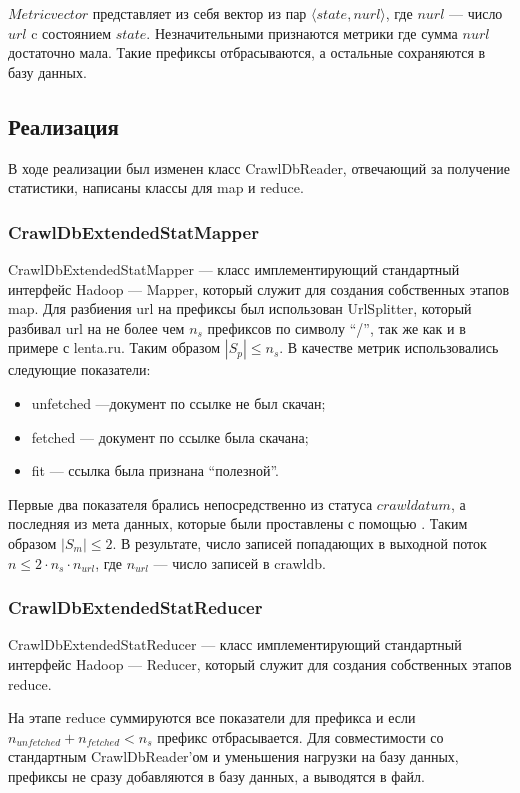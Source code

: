 $Metricvector$ представляет из себя вектор из пар $\langle state, nurl \rangle$, где $nurl$ --- число $url$ c состоянием $state$.
Незначительными признаются метрики где сумма $nurl$ достаточно мала. Такие префиксы отбрасываются, а остальные сохраняются в базу данных.

\subsection{Реализация}
В ходе реализации был изменен класс CrawlDbReader, отвечающий за получение статистики, написаны классы для map и reduce.

\subsubsection{CrawlDbExtendedStatMapper}
CrawlDbExtendedStatMapper --- класс имплементирующий стандартный интерфейс Hadoop --- Mapper, который служит для создания собственных этапов map.
Для разбиения url на префиксы был использован UrlSplitter, который разбивал url на не более чем $n_{s}$ префиксов по символу ``/'', так же как и в примере с lenta.ru. Таким образом $|S_{p}|\leqslant n_{s}$.
В качестве метрик использовались следующие показатели:
\begin{itemize}
 \item unfetched ---документ по ссылке не был скачан;
 \item fetched --- документ по ссылке была скачана;
 \item fit --- ссылка была признана ``полезной''.
\end{itemize}
Первые два показателя брались непосредственно из статуса $crawldatum$, а последняя из мета данных, которые были проставлены с помощью . Таким образом $|S_{m}|\leqslant2$. В результате, число записей попадающих в выходной поток $n\leqslant 2\cdot n_{s}\cdot n_{url}$, где $n_{url}$ --- число записей в crawldb.

\subsubsection{CrawlDbExtendedStatReducer}
CrawlDbExtendedStatReducer --- класс имплементирующий стандартный интерфейс Hadoop --- Reducer, который служит для создания собственных этапов reduce.

На этапе reduce суммируются все показатели для префикса и если $n_{unfetched}+n_{fetched} < n_{s}$ префикс отбрасывается. Для совместимости со стандартным CrawlDbReader'ом и уменьшения нагрузки на базу данных, префиксы не сразу добавляются в базу данных, а выводятся в файл. 
